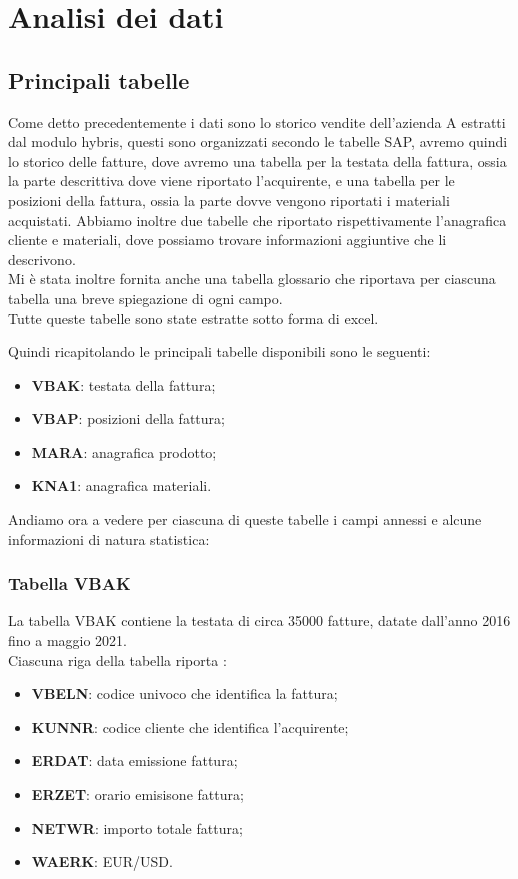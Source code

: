 
\hypertarget{(chap:capitolo3)}{}
\chapter{Analisi dei dati}
\section{Principali tabelle}
Come detto precedentemente i dati sono lo storico vendite dell'azienda A estratti dal modulo hybris, questi sono organizzati secondo le tabelle SAP, avremo quindi lo storico delle fatture, dove avremo una tabella per la testata della fattura, ossia la parte descrittiva dove viene riportato l'acquirente, e una tabella per le posizioni della fattura, ossia la parte dovve vengono riportati i materiali acquistati. Abbiamo inoltre due tabelle che riportato rispettivamente l'anagrafica cliente e materiali, dove possiamo trovare informazioni aggiuntive che li descrivono.\\Mi è stata inoltre fornita anche una tabella glossario che riportava per ciascuna tabella una breve spiegazione di ogni campo. \\
Tutte queste tabelle sono state estratte sotto forma di excel.

Quindi ricapitolando le principali tabelle disponibili sono le seguenti:
\begin{itemize}
	\item \textbf{VBAK}: testata della fattura;
	\item \textbf{VBAP}: posizioni della fattura;
	\item \textbf{MARA}: anagrafica prodotto;
	\item \textbf{KNA1}: anagrafica materiali.
\end{itemize}

Andiamo ora a vedere per ciascuna di queste tabelle i campi annessi e alcune informazioni di natura statistica:
\subsection{Tabella VBAK}
La tabella VBAK contiene la testata di circa 35000 fatture, datate dall'anno 2016 fino a maggio 2021.\\
Ciascuna riga della tabella riporta :
\begin{itemize}
	\item \textbf{VBELN}: codice univoco che identifica la fattura;
	\item \textbf{KUNNR}: codice cliente che identifica l'acquirente;
	\item \textbf{ERDAT}: data emissione fattura;
	\item \textbf{ERZET}: orario emisisone fattura;
	\item \textbf{NETWR}: importo totale fattura;
	\item \textbf{WAERK}: EUR/USD.
\end{itemize}

